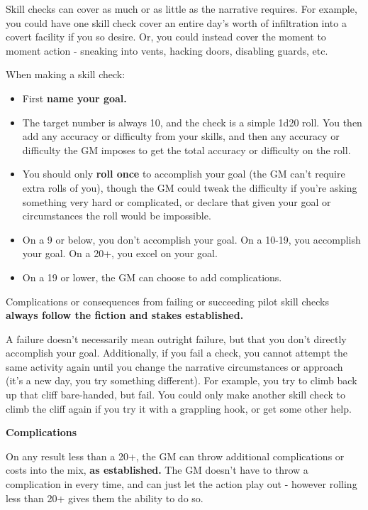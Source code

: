 Skill checks can cover as much or as little as the narrative requires. For example, you could have one skill check cover an entire day's worth of infiltration into a covert facility if you so desire. Or, you could instead cover the moment to moment action - sneaking into vents, hacking doors, disabling guards, etc.

When making a skill check:
\begin{itemize}
\item First \textbf{name your goal.}
\item The target number is always 10, and the check is a simple 1d20 roll. You then add any accuracy or difficulty from your skills, and then any accuracy or difficulty the GM imposes to get the total accuracy or difficulty on the roll. 
\item You should only \textbf{roll once} to accomplish your goal (the GM can't require extra rolls of you), though the GM could tweak the difficulty if you're asking something very hard or complicated, or declare that given your goal or circumstances the roll would be impossible.
\item On a 9 or below, you don't accomplish your goal. On a 10-19, you accomplish your goal. On a 20+, you excel on your goal. 
\item On a 19 or lower, the GM can choose to add complications.
\end{itemize}  

Complications or consequences from failing or succeeding pilot skill checks \textbf{always follow the fiction and stakes established.} 


A failure doesn't necessarily mean outright failure, but that you don't directly accomplish your goal. Additionally, if you fail a check, you cannot attempt the same activity again until you change the narrative circumstances or approach (it's a new day, you try something different). For example, you try to climb back up that cliff bare-handed, but fail. You could only make another skill check to climb the cliff again if you try it with a grappling hook, or get some other help.

\begin{center}
\textbf{Complications}
\end{center}

On any result less than a 20+, the GM can throw additional complications or costs into the mix, \textbf{as established.} The GM doesn't have to throw a complication in every time, and can just let the action play out - however rolling less than 20+ gives them the ability to do so. 

